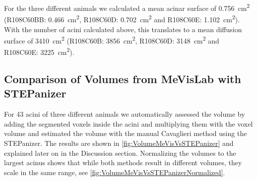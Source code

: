 \documentclass[twoside,paper=a4,abstract=true,english,DIV=calc]{scrartcl}
\newcommand{\numberofacini}{43}
\begin{document}
For the three different animals we calculated a mean acinar surface of \SI{0.756}{\centi\metre\squared} (R108C60BB: \SI{0.466}{\centi\metre\squared}, R108C60D: \SI{0.702}{\centi\metre\squared} and R108C60E: \SI{1.102}{\centi\metre\squared}). With the number of acini calculated above, this translates to a mean diffusion surface of \SI{3410}{\centi\metre\squared} (R108C60B: \SI{3856}{\centi\metre\squared}, R108C60D: \SI{3148}{\centi\metre\squared} and R108C60E: \SI{3225}{\centi\metre\squared}).

\subsection{Comparison of Volumes from MeVisLab with STEPanizer}
For \numberofacini\xspace acini of three different animals we automatically assessed the volume by adding the segmented voxels inside the acini and multiplying them with the voxel volume and estimated the volume with the manual Cavaglieri method \cite{Hsia2010} using the STEPanizer. The results are shown in \autoref{fig:VolumeMeVisVsSTEPanizer} and explained later on in the Discussion section. Normalizing the volumes to the largest acinus shows that while both methods result in different volumes, they scale in the same range, see \autoref{fig:VolumeMeVisVsSTEPanizerNormalized}.
\end{document}
